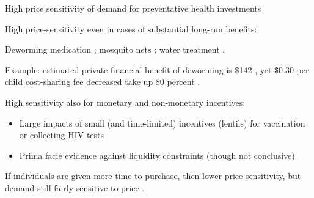 \documentclass[aspectratio=169, 10pt, handout]{beamer}
\newenvironment{wideitemize}{\itemize\addtolength{\itemsep}{10pt}}{\enditemize}
\begin{document}
\begin{frame}{High price sensitivity of demand for preventative health investments}

\begin{wideitemize}

	\item High price-sensitivity even in cases of substantial long-run benefits:
	
    \begin{wideitemize}
    
        \item Deworming medication \citep{miguel2007worms}; mosquito nets \citep{cohen2010free}; water treatment \citep{ashraf2010can}.
    
        \item Example: estimated private financial benefit of deworming is \$142 \citep{baird2016worms}, yet \$0.30 per child cost-sharing fee decreased take up 80 percent \citep{miguel2007worms}.
        
    \end{wideitemize}

    \item High sensitivity also for monetary and non-monetary incentives: 
    
    \begin{itemize}
        
        \item Large impacts of small (and time-limited) incentives (lentils) for vaccination \citep{banerjee2010improving} or collecting HIV tests \citep{thornton2008demand}
        
        \item Prima facie evidence against liquidity constraints (though not conclusive)
        
    \end{itemize}
        
	\item If individuals are given more time to purchase, then lower price sensitivity, but demand still fairly sensitive to price \citep{dupas2009malariaprevent}.

	

\end{wideitemize}

\end{frame}
\end{document}
